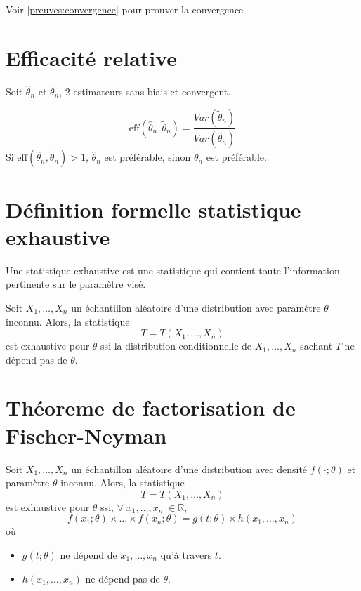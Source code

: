 \documentclass[]{book}
\providecommand{\tightlist}{%
  \setlength{\itemsep}{0pt}\setlength{\parskip}{0pt}}
\theoremstyle{definition}
\theoremstyle{definition}
\theoremstyle{definition}
\theoremstyle{remark}
\begin{document}
Voir \ref{preuves:convergence} pour prouver la convergence

\section{Efficacité relative}\label{stats:effrela}

Soit \(\hat{\theta}_n\) et \(\tilde{\theta}_n\), 2 estimateurs sans
biais et convergent.

\[
\text{eff}(\hat{\theta}_n,\tilde{\theta}_n)= \frac{Var(\tilde{\theta}_n)}{Var(\hat{\theta}_n)}
\] Si \(\text{eff}(\hat{\theta}_n,\tilde{\theta}_n)>1\),
\(\hat{\theta}_n\) est préférable, sinon \(\tilde{\theta}_n\) est
préférable.

\section{Définition formelle statistique
exhaustive}\label{definition-formelle-statistique-exhaustive}

Une statistique exhaustive est une statistique qui contient toute
l'information pertinente sur le paramètre visé.

Soit \(X_1,\dots,X_n\) un échantillon aléatoire d'une distribution avec
paramètre \(\theta\) inconnu. Alors, la statistique \[
T=T(X_1,\dots,X_n)
\] est exhaustive pour \(\theta\) ssi la distribution conditionnelle de
\(X_1,\dots,X_n\) sachant \(T\) ne dépend pas de \(\theta\).

\section{Théoreme de factorisation de
Fischer-Neyman}\label{theoreme-de-factorisation-de-fischer-neyman}

Soit \(X_1,\dots,X_n\) un échantillon aléatoire d'une distribution avec
densité \(f(\cdot;\theta)\) et paramètre \(\theta\) inconnu. Alors, la
statistique \[
T=T(X_1,\dots,X_n)
\] est exhaustive pour \(\theta\) ssi,
\(\forall\;x_1,\dots,x_n\;\in\mathbb{R}\), \[
f(x_1;\theta)\times\dots\times f(x_n;\theta)=g(t;\theta)\times h(x_1,\dots,x_n)
\] où

\begin{itemize}
\tightlist
\item
  \(g(t;\theta)\) ne dépend de \(x_1,\dots,x_n\) qu'à travers \(t\).
\item
  \(h(x_1,\dots,x_n)\) ne dépend pas de \(\theta\).
\end{itemize}
\end{document}
